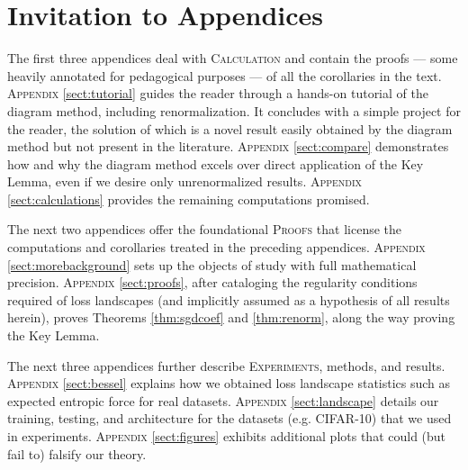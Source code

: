 \documentclass{article}
\theoremstyle{plain}
\theoremstyle{definition}
\begin{document}

    
    


\clearpage
\newpage
\renewcommand{\thesection}{\Alph{section}}
\setcounter{section}{0}

\section*{Invitation to Appendices}
    The first three appendices deal with \textsc{Calculation} and contain the
    proofs --- some heavily annotated for pedagogical purposes --- of all the
    corollaries in the text.
    \textsc{Appendix} \ref{sect:tutorial} guides the reader through a hands-on
        tutorial of the diagram method, including renormalization.  It
        concludes with a simple project for the reader, the solution of which
        is a novel result easily obtained by the diagram method but not present
        in the literature. 
    \textsc{Appendix} \ref{sect:compare} demonstrates how and why the diagram
        method excels over direct application of the Key Lemma, even if we
        desire only unrenormalized results.
    \textsc{Appendix} \ref{sect:calculations} provides the remaining
        computations promised.

    The next two appendices offer the foundational \textsc{Proofs} that
    license the computations and corollaries treated in the preceding
    appendices.
    \textsc{Appendix} \ref{sect:morebackground} sets up the objects of study
        with full mathematical precision.
    \textsc{Appendix} \ref{sect:proofs}, after cataloging the regularity
        conditions required of loss landscapes (and implicitly assumed as a
        hypothesis of all results herein), proves Theorems \ref{thm:sgdcoef}
        and \ref{thm:renorm}, along the way proving the Key Lemma.

    The next three appendices further describe \textsc{Experiments}, methods,
    and results.
    \textsc{Appendix} \ref{sect:bessel} explains how we obtained loss landscape
        statistics such as expected entropic force for real datasets.
    \textsc{Appendix} \ref{sect:landscape} details our training, testing, and
        architecture for the datasets (e.g. CIFAR-10) that we used in
        experiments.
    \textsc{Appendix} \ref{sect:figures} exhibits additional plots that could
        (but fail to) falsify our theory.
\end{document}
